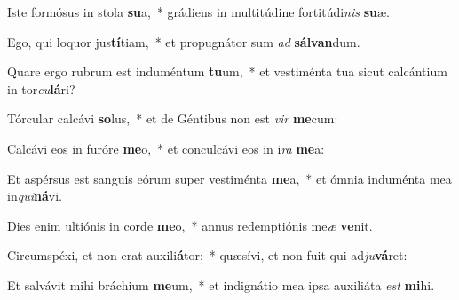 \item Iste formósus in stola \textbf{su}a,~* grádiens in multitúdine fortitúdi\textit{nis} \textbf{su}æ.
\item Ego, qui loquor jus\textbf{tí}tiam,~* et propugnátor sum \textit{ad} \textbf{sál}\textbf{van}dum.
\item Quare ergo rubrum est induméntum \textbf{tu}um,~* et vestiménta tua sicut calcántium in tor\textit{cu}\textbf{lá}ri?
\item Tórcular calcávi \textbf{so}lus,~* et de Géntibus non est \textit{vir} \textbf{me}cum:
\item Calcávi eos in furóre \textbf{me}o,~* et conculcávi eos in i\textit{ra} \textbf{me}a:
\item Et aspérsus est sanguis eórum super vestiménta \textbf{me}a,~* et ómnia induménta mea in\textit{qui}\textbf{ná}vi.
\item Dies enim ultiónis in corde \textbf{me}o,~* annus redemptiónis me\textit{æ} \textbf{ve}nit.
\item Circumspéxi, et non erat auxili\textbf{á}tor:~* quæsívi, et non fuit qui ad\textit{ju}\textbf{vá}ret:
\item Et salvávit mihi bráchium \textbf{me}um,~* et indignátio mea ipsa auxiliáta \textit{est} \textbf{mi}hi.
